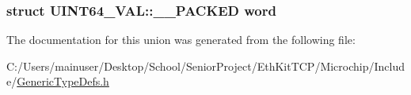 \subsubsection[{word}]{\setlength{\rightskip}{0pt plus 5cm}struct {\bf U\+I\+N\+T64\+\_\+\+V\+A\+L\+::\+\_\+\+\_\+\+P\+A\+C\+K\+E\+D}  word}\label{union_u_i_n_t64___v_a_l_a389c31af76ebf129e4c0b4c30ace5b51}


The documentation for this union was generated from the following file\+:\begin{DoxyCompactItemize}
\item 
C\+:/\+Users/mainuser/\+Desktop/\+School/\+Senior\+Project/\+Eth\+Kit\+T\+C\+P/\+Microchip/\+Include/\hyperlink{_generic_type_defs_8h}{Generic\+Type\+Defs.\+h}\end{DoxyCompactItemize}
